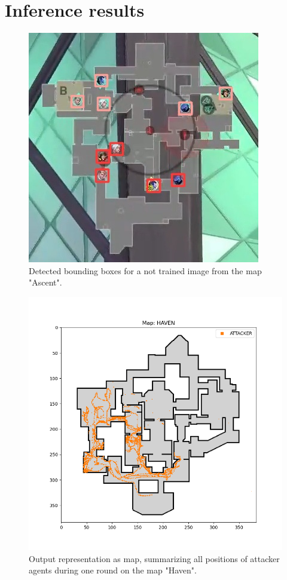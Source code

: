 \newpage

\section{Inference results}\label{sec:ea:inferenceResults}

\begin{figure}[H]
	\centering
	\includegraphics[width=0.8\linewidth]{images/a02-detect}
	\caption[Detected bounding boxes.]{Detected bounding boxes for a not trained image from the map "Ascent".}
	\label{fig:ea:outDetect}
\end{figure}

\begin{figure}[H]
	\centering
	\includegraphics[width=0.95\linewidth]{images/a03-att-output}
	\caption[Output representation as map for attacker.]{Output representation as map, summarizing all positions 
		of attacker agents during one round on the map "Haven".}
	\label{fig:ea:outputAtt}
\end{figure}

